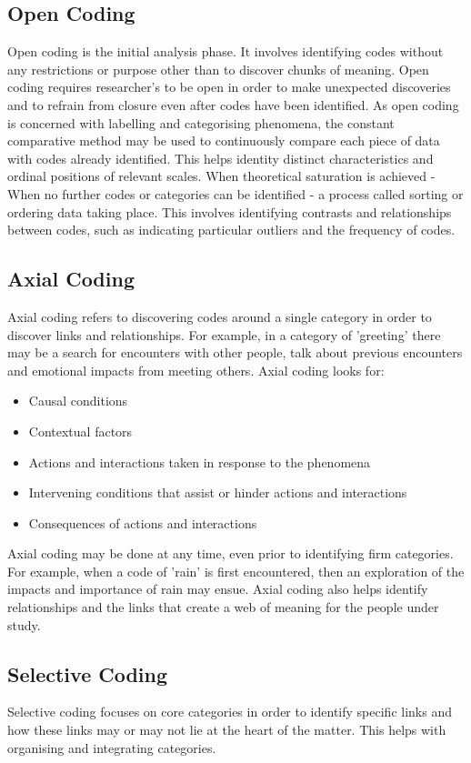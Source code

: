 \documentclass{article}
\begin{document}
\subsection{Open Coding}
Open coding is the initial analysis phase. It involves identifying codes without any restrictions or purpose other than to discover chunks of meaning. Open coding requires researcher's to be open in order to make unexpected discoveries and to refrain from closure even after codes have been identified. As open coding is concerned with labelling and categorising phenomena, the constant comparative method may be used to continuously compare each piece of data with codes already identified. This helps identity distinct characteristics and ordinal positions of relevant scales. When theoretical saturation is achieved - When no further codes or categories can be identified - a process called sorting or ordering data taking place. This involves identifying contrasts and relationships between codes, such as indicating particular outliers and the frequency of codes. 

\subsection{Axial Coding}
Axial coding refers to discovering codes around a single category in order to discover links and relationships. For example, in a category of 'greeting' there may be a search for encounters with other people, talk about previous encounters and emotional impacts from meeting others. Axial coding looks for:
\begin{itemize}
    \item Causal conditions
    \item Contextual factors
    \item Actions and interactions taken in response to the phenomena
    \item Intervening conditions that assist or hinder actions and interactions
    \item Consequences of actions and interactions
\end{itemize}
Axial coding may be done at any time, even prior to identifying firm categories. For example, when a code of 'rain' is first encountered, then an exploration of the impacts and importance of rain may ensue. Axial coding also helps identify relationships and the links that create a web of meaning for the people under study.

\subsection{Selective Coding}
Selective coding focuses on core categories in order to identify specific links and how these links may or may not lie at the heart of the matter. This helps with organising and integrating categories. 
\end{document}
